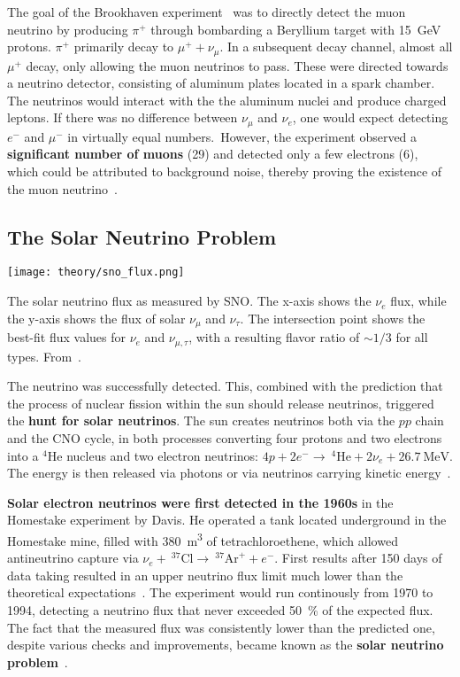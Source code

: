 The goal of the Brookhaven experiment~ was to directly detect the muon neutrino by producing $\pi^+$ through bombarding a Beryllium target with \SI{15}{\giga\eV} protons. $\pi^+$ primarily decay to $\mu^+ + \nu_\mu$. In a subsequent decay channel, almost all $\mu^+$ decay, only allowing the muon neutrinos to pass. These were directed towards a neutrino detector, consisting of aluminum plates located in a spark chamber. The neutrinos would interact with the the aluminum nuclei and produce charged leptons. If there was no difference between $\nu_\mu$ and $\nu_e$, one would expect detecting $e^-$ and $\mu^-$ in virtually equal numbers.\ However, the experiment observed a \textbf{significant number of muons} (29) and detected only a few electrons (6), which could be attributed to background noise, thereby proving the existence of the muon neutrino~\cite{Danby1962}.

\subsection{The Solar Neutrino Problem}

\begin{marginfigure}
    \texttt{[image: theory/sno\_flux.png]}
    \caption[Solar neutrino flux measured by SNO]{The solar neutrino flux as measured by SNO\@. The x-axis shows the $\nu_e$ flux, while the y-axis shows the flux of solar $\nu_\mu$ and $\nu_\tau$. The intersection point shows the best-fit flux values for $\nu_e$ and $\nu_{\mu,\tau}$, with a resulting flavor ratio of $\sim1/3$ for all types. From~\cite{Ahmad2002}.}
\end{marginfigure}

The neutrino was successfully detected. This, combined with the prediction that the process of nuclear fission within the sun should release neutrinos, triggered the \textbf{hunt for solar neutrinos}. The sun creates neutrinos both via the $pp$ chain and the CNO cycle, in both processes converting four protons and two electrons into a $^4\text{He}$ nucleus and two electron neutrinos: $4p + 2e^- \rightarrow  ~^4\text{He} + 2\nu_e + \SI{26.7}{\mega\eV}$. The energy is then released via photons or via neutrinos carrying kinetic energy~\cite{Giunti2007}.

\textbf{Solar electron neutrinos were first detected in the 1960s} in the Homestake experiment by Davis. He operated a tank located underground in the Homestake mine, filled with \SI{380}{\meter\cubed} of tetrachloroethene, which allowed antineutrino capture via $\nu_e +~ ^{37}\text{Cl} \rightarrow ~ ^{37}\text{Ar}^+ + e^-$. First results after 150 days of data taking resulted in an upper neutrino flux limit much lower than the theoretical expectations~. The experiment would run continously from 1970 to 1994, detecting a neutrino flux that never exceeded \SI{50}{\percent} of the expected flux. The fact that the measured flux was consistently lower than the predicted one, despite various checks and improvements, became known as the \textbf{solar neutrino problem}~.

